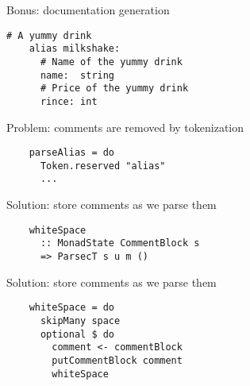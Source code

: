 \documentclass[20pt]{beamer}
\newcommand{\vspaced}{
    \vspace{5mm}
}
\begin{document}
\begin{frame}
    Bonus: documentation generation
\end{frame}


\begin{frame}
    \begin{lstlisting}[keywords = {}]
    # A yummy drink
    alias milkshake:
      # Name of the yummy drink
      name:  string
      # Price of the yummy drink
      rince: int
    \end{lstlisting}
\end{frame}

\begin{frame}
    Problem: comments are removed by tokenization \\
    \vspaced
    \begin{lstlisting}
    parseAlias = do
      Token.reserved "alias"
      ...
    \end{lstlisting}
\end{frame}

\begin{frame}
    Solution: store comments as we parse them \\
    \vspaced
    \begin{lstlisting}
    whiteSpace
      :: MonadState CommentBlock s
      => ParsecT s u m ()
    \end{lstlisting}
\end{frame}

\begin{frame}
    Solution: store comments as we parse them \\
    \vspaced
    \begin{lstlisting}
    whiteSpace = do
      skipMany space
      optional $ do
        comment <- commentBlock
        putCommentBlock comment
        whiteSpace
    \end{lstlisting}
\end{frame}



\begin{frame}[plain]
\end{frame}
\end{document}
